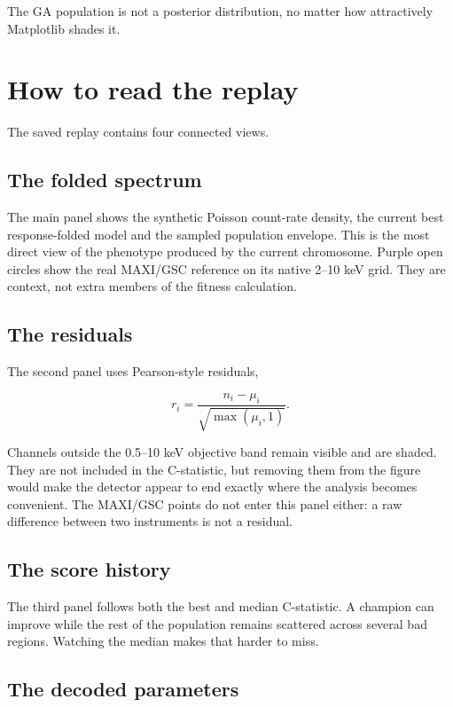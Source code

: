 \documentclass[11pt]{article}
\begin{document}
The GA population is not a posterior distribution, no matter how attractively
Matplotlib shades it.

\section{How to read the replay}

The saved replay contains four connected views.

\subsection*{The folded spectrum}

The main panel shows the synthetic Poisson count-rate density, the current best
response-folded model and the sampled population envelope. This is the most
direct view of the phenotype produced by the current chromosome. Purple open
circles show the real MAXI/GSC reference on its native 2--10 keV grid. They are
context, not extra members of the fitness calculation.

\subsection*{The residuals}

The second panel uses Pearson-style residuals,

\begin{equation}
  r_i = \frac{n_i-\mu_i}{\sqrt{\max(\mu_i,1)}}.
\end{equation}

Channels outside the 0.5--10 keV objective band remain visible and are shaded.
They are not included in the C-statistic, but removing them from the figure
would make the detector appear to end exactly where the analysis becomes
convenient. The MAXI/GSC points do not enter this panel either: a raw difference
between two instruments is not a residual.

\subsection*{The score history}

The third panel follows both the best and median C-statistic. A champion can
improve while the rest of the population remains scattered across several bad
regions. Watching the median makes that harder to miss.

\subsection*{The decoded parameters}
\end{document}
